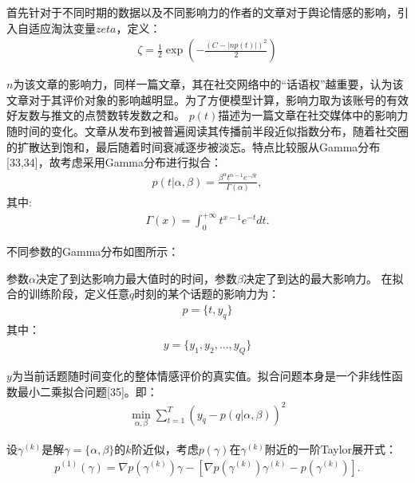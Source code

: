 \documentclass[UTF8]{csoarticle}
\begin{document}
首先针对于不同时期的数据以及不同影响力的作者的文章对于舆论情感的影响，引入自适应淘汰变量$zeta$，定义：
\begin{align}\label{eq:zeta}
\zeta=\frac{1}{2}\exp{(-\frac{(C-|np(t)|)^2}{2})}
\end{align}

$n$为该文章的影响力，同样一篇文章，其在社交网络中的“话语权”越重要，认为该文章对于其评价对象的影响越明显。为了方便模型计算，影响力取为该账号的有效好友数与推文的点赞数转发数之和。
$p(t)$描述为一篇文章在社交媒体中的影响力随时间的变化。文章从发布到被普遍阅读其传播前半段近似指数分布，随着社交圈的扩散达到饱和，最后随着时间衰减逐步被淡忘。特点比较服从Gamma分布[33,34]，故考虑采用Gamma分布进行拟合：
\begin{align}\label{eq:gammaDist}
p(t|\alpha,\beta)=\frac{\beta^{\alpha}t^{\alpha-1}e^{-\beta t}}{\Gamma(\alpha)},
\end{align}
其中:
\begin{align}\label{eq:gammaX}
\Gamma(x)=\int_0^{+\infty}{t^{x-1}e^{-t}dt}.
\end{align}

不同参数的Gamma分布如图所示：

参数$\alpha$决定了到达影响力最大值时的时间，参数$\beta$决定了到达的最大影响力。
在拟合的训练阶段，定义任意$q$时刻的某个话题的影响力为：
\begin{align}\label{eq:influences}
p=\{t,y_q\}
\end{align}
其中：
\begin{align}\label{eq:influence}
y=\{y_1,y_2,...,y_Q \}
\end{align}

$y$为当前话题随时间变化的整体情感评价的真实值。拟合问题本身是一个非线性函数最小二乘拟合问题[35]。即：
\begin{align}\label{eq:leastSquare}
\mathop{min}\limits_{\alpha,\beta}\sum_{t=1}^T{(y_q-p(q|\alpha,\beta))^2}
\end{align}

设$\gamma^{(k)}$是解$\gamma=\{\alpha,\beta\}$的$k$阶近似，考虑$p(\gamma)$在$\gamma^{(k)}$附近的一阶Taylor展开式：
\begin{align}\label{eq:gammaTaylor1}
p^{(1)}(\gamma)=\nabla p(\gamma^{(k)})\gamma-[\nabla p(\gamma^{(k)})\gamma^{(k)} - p(\gamma^{(k)})].
\end{align}
\end{document}
